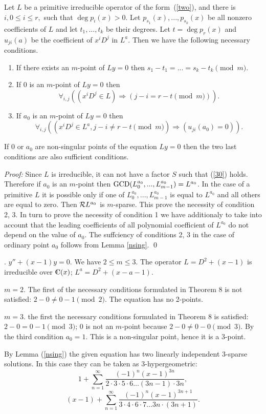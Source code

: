 {{\begin{Theorem}
Let $L$ be a primitive
irreducible operator of the form~(\ref{two}), and
there is $i, 0\leq i \leq r,$ such that
$\deg p_i(x)>0$. Let
$p_{s_1}(x),...,p_{s_k}(x)$ be all nonzero coefficients of $L$ and
let $t_1,...,t_k$ be their degrees. Let $t=\deg p_r(x)$ and
$u_{ji}(a)$ be the coefficient of $x^iD^j$ in $L^a$. Then we have the
following necessary conditions.
\begin{enumerate} \item If there
exists an $m$-point of $Ly=0$ then $s_1-t_1=...=s_k-t_k \pmod m$.
\item If 0 is an $m$-point of $Ly=0$ then
$$
\forall _{i,j}
((x^iD^j\in L)\Rightarrow(j-i = r-t \pmod m)).
$$
\item If $a_0$ is an $m$-point of $Ly=0$ then
$$
\forall _{i,j}
((x^iD^j\in L^a,j-i \ne r-t \pmod m)\Rightarrow( u_{ji}(a_0)=0)).
$$
\end{enumerate}
If 0 or $a_0$ are non-singular points of the equation $Ly=0$ then
the two last
conditions are also sufficient conditions.
\end{Theorem}
{\em Proof:\/}
Since $L$ is irreducible, it can not have a factor $S$ such that
(\ref{30}) holds. Therefore if $a_0$ is an $m$-point then
$\mathop{\rm GCD}(L_0^{a_0},...,L_{m-1}^{a_0})=L^{a_0}$. In the case of a
primitive $L$ it is possible only if one of
$L_0^{a_0},...,L_{m-1}^{a_0}$
is equal to $L^{a_0}$ and all others are equal to zero. Then ${\cal R}
L^{a_0}$ is $m$-sparse. This prove the necessity of condition 2, 3.
In turn to prove the necessity of condition 1 we have additionaly to
take into account that the leading coefficients of all polynomial
coefficient of $L^{a_0}$ do not depend on the value of $a_0$. The
suffciency of conditions 2, 3 in the case of ordinary point $a_0$
follows from Lemma \ref{nsing}. \qed

. $y''+(x-1)y=0$. We have $2\le m\le 3$. The
operator $L=D^2+(x-1)$ is irreducible over $\complex(x)$; $L^a=
D^2+(x-a-1)$.

$m=2$. The first of the necessary conditions formulated in Theorem 8 is not
satisfied: $2-0\ne 0-1 \pmod 2$. The equation has no 2-points.

$m=3$. the first the necessary conditions formulated in Theorem 8 is
satisfied: $2-0=0-1 \pmod 3$; 0 is not an $m$-point because
$2-0\ne 0-0 \pmod 3$. By the third condition $a_0=1$.
This is a non-singular point,
hence it is a 3-point.

By Lemma (\ref{nsing})
the given equation has two linearly independent 3-sparse solutions.
In this case they can be taken as 3-hypergeometric:
$$
1+\sum_{n=1}^\infty \frac{(-1)^n(x-1)^{3n}}
{2\cdot 3\cdot 5\cdot 6\dots (3n-1)\cdot 3n},
$$
$$
(x-1)+\sum_{n=1}^\infty \frac{(-1)^n(x-1)^{3n+1}}
{3\cdot 4\cdot 6\cdot 7\dots 3n\cdot (3n+1)}.
$$

}}
